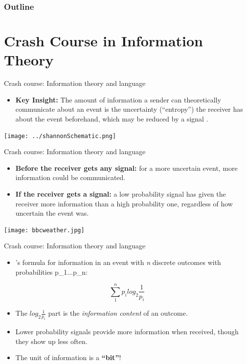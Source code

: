 \documentclass[hyperref={pdfpagelabels=false}]{beamer}
\begin{document}
\begin{frame}
	\frametitle{Outline}
	\tableofcontents
\end{frame}


\section{Crash Course in Information Theory}

\begin{frame}{Crash course: Information theory and language} 
\begin{itemize}
	\item \textbf{Key Insight:} The amount of information a sender can theoretically communicate about an event is the uncertainty (``entropy'') the receiver has about the event beforehand, which may be reduced by a signal \citep{hartley1928, shannon1948}.
\end{itemize}
\begin{center}

	\texttt{[image: ../shannonSchematic.png]} 


\end{center}



\end{frame}

\begin{frame}{Crash course: Information theory and language} 
	\begin{itemize}
		\item \textbf{Before the receiver gets any signal:} for a more uncertain event, more information could be communicated.
		\item \textbf{If the receiver gets a signal:} a low probability signal has given the receiver more information than a high probability one, regardless of how uncertain the event was. 
	\end{itemize}
	\begin{center}
			\texttt{[image: bbcweather.jpg]} 
	\end{center}
\end{frame}


\begin{frame}{Crash course: Information theory and language} 
	\begin{itemize}
		\item \citet{shannon1948}'s formula for information in an event with \textsl{n} discrete outcomes with probabilities p_1...p_n:
	\end{itemize}
	\begin{center}
		$$\sum_{1}^{n} p_i log_2 \frac{1}{p_i}$$
	\end{center}
	\begin{itemize}
		\item The $log_2 \frac{1}{p_i}$ part is the \textsl{information content} of an outcome.
		\item Lower probability signals provide more information when received, though they show up less often.
		\item The unit of information is a \textbf{``bit''}!
	\end{itemize}
	
\end{frame}
\end{document}

